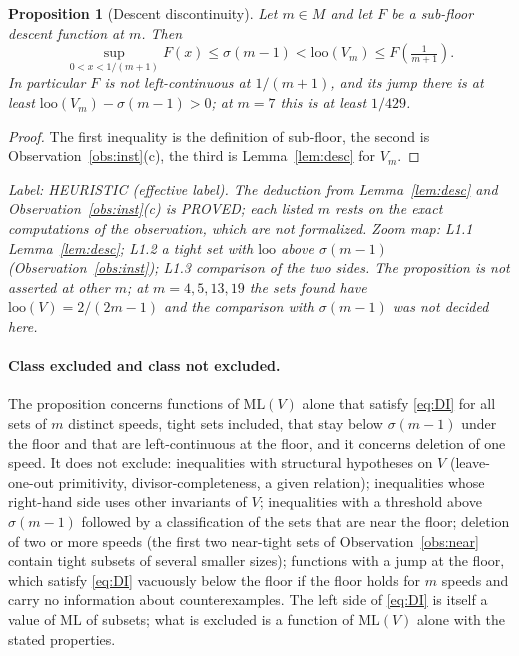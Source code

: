 \documentclass[11pt]{article}
\newtheorem{proposition}[theorem]{Proposition}
\theoremstyle{remark}
\newcommand{\ML}{\mathrm{ML}}
\newcommand{\loo}{\mathrm{loo}}
\newcommand{\lab}[1]{\par\smallskip\noindent\textit{Label: #1.}}
\begin{document}
\begin{proposition}[Descent discontinuity]\label{prop:nogo}
Let $m\in M$ and let $F$ be a sub-floor descent function at $m$. Then
\[\sup_{0<x<1/(m+1)}F(x)\le\sigma(m-1)<\loo(V_m)\le F\!\left(\tfrac1{m+1}\right).\]
In particular $F$ is not left-continuous at $1/(m+1)$, and its jump there is at least $\loo(V_m)-\sigma(m-1)>0$; at $m=7$ this is at least $1/429$.
\end{proposition}
\begin{proof}
The first inequality is the definition of sub-floor, the second is Observation~\ref{obs:inst}(c), the third is Lemma~\ref{lem:desc} for $V_m$.
\end{proof}
\lab{HEURISTIC (effective label). The deduction from Lemma~\ref{lem:desc} and Observation~\ref{obs:inst}(c) is PROVED; each listed $m$ rests on the exact computations of the observation, which are not formalized. Zoom map: L1.1 Lemma~\ref{lem:desc}; L1.2 a tight set with $\loo$ above $\sigma(m-1)$ (Observation~\ref{obs:inst}); L1.3 comparison of the two sides. The proposition is not asserted at other $m$; at $m=4,5,13,19$ the sets found have $\loo(V)=2/(2m-1)$ and the comparison with $\sigma(m-1)$ was not decided here}

\paragraph{Class excluded and class not excluded.} The proposition concerns functions of $\ML(V)$ alone that satisfy \eqref{eq:DI} for all sets of $m$ distinct speeds, tight sets included, that stay below $\sigma(m-1)$ under the floor and that are left-continuous at the floor, and it concerns deletion of one speed. It does not exclude: inequalities with structural hypotheses on $V$ (leave-one-out primitivity, divisor-completeness, a given relation); inequalities whose right-hand side uses other invariants of $V$; inequalities with a threshold above $\sigma(m-1)$ followed by a classification of the sets that are near the floor; deletion of two or more speeds (the first two near-tight sets of Observation~\ref{obs:near} contain tight subsets of several smaller sizes); functions with a jump at the floor, which satisfy \eqref{eq:DI} vacuously below the floor if the floor holds for $m$ speeds and carry no information about counterexamples. The left side of \eqref{eq:DI} is itself a value of $\ML$ of subsets; what is excluded is a function of $\ML(V)$ alone with the stated properties.
\end{document}
